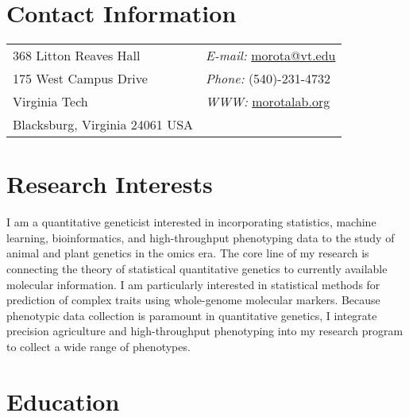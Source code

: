 \documentclass[margin,line,10pt]{res}
\begin{document}

\begin{resume}
\section{\sc Contact Information}
\vspace{.05in}
\begin{tabular}{@{}p{2in}p{4in}}
368 Litton Reaves Hall  & \hspace{2.5cm} {\it E-mail:}  \href{mailto:morota@vt.edu}{morota@vt.edu} \\       
 175 West Campus Drive  & \hspace{2.5cm} {\it Phone:} (540)-231-4732\\     
Virginia Tech  & \hspace{2.5cm} {\it WWW:} \textcolor{blue}{\href{http://morotalab.org/}{morotalab.org}  }\\
Blacksburg, Virginia 24061 USA  & \\
\end{tabular}


\vspace{0.4cm}
\section{\sc Research Interests}
I am a quantitative geneticist interested in incorporating statistics, machine learning,  bioinformatics, and high-throughput phenotyping data to the study of animal and plant genetics in the omics era. The core line of my research is connecting the theory of statistical quantitative genetics to currently available molecular information. 
I am particularly interested in statistical methods for prediction of complex traits using whole-genome molecular markers. Because phenotypic data collection is paramount in quantitative genetics, I integrate precision agriculture and high-throughput phenotyping into my research program to collect a wide range of phenotypes. 


\vspace{0.4cm}
\section{\sc Education}


\end{resume}
\end{document}
